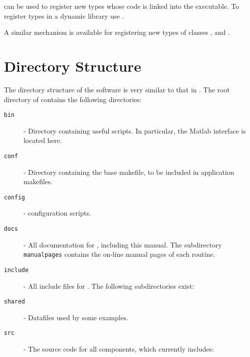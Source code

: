 	 can be used to register new types whose code is linked into the executable. To register types in a dynamic library use .

	A similar mechanism is available for registering new types of classes ,  and .

\section{Directory Structure}

	The directory structure of the \slepc software is very similar to that in \petsc. The root directory of \slepc contains the following directories:
\begin{description}
\item[\texttt{bin}] - Directory containing useful scripts. In particular, the Matlab interface is located here.
\item[\texttt{conf}] - Directory containing the base \slepc makefile, to be included in application makefiles.
\item[\texttt{config}] - \slepc configuration scripts. 
\item[\texttt{docs}] - All documentation for \slepc, including this manual. The subdirectory \texttt{manualpages} contains the on-line manual pages of each \slepc routine.
\item[\texttt{include}] - All include files for \slepc. The following subdirectories exist:
\item[\texttt{shared}] - Datafiles used by some examples.
\item[\texttt{src}] - The source code for all \slepc components, which currently includes:
\end{description}
